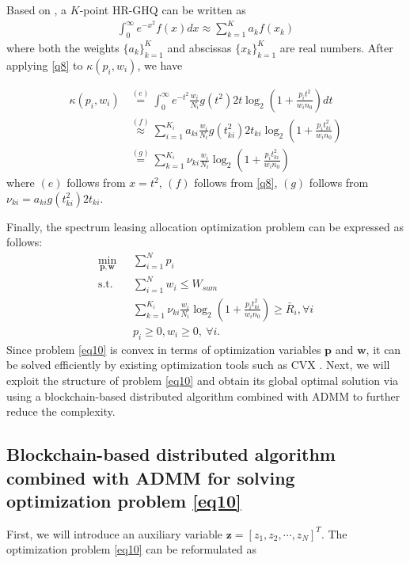 \documentclass[journal]{IEEEtran}
\begin{document}
Based on \cite{NMSteen}, a $K$-point HR-GHQ can be written as
\begin{align} \label{q8}
\int_{0}^{\infty}e^{-x^2} f\left(x\right) dx \approx \sum\limits_{k = 1}^{K} a_k f\left(x_k\right)
\end{align}
where both the weights $\{a_k\}_{k = 1}^K$ and abscissas $\{x_k\}_{k = 1}^K$ are real numbers. After applying \eqref{q8} to $\kappa \left(p_i, w_i\right)$, we have

\begin{align} \label{q9}
\kappa \left(p_i, w_i\right) &\overset{\left(e\right)}{=} \int_{0}^{\infty}e^{-t^2}\frac{w_i}{N_i} g\left(t^2\right) 2t \log_2\left(1 + \frac{p_it^2}{w_in_0}\right)dt  \nonumber \\
& \overset{\left(f\right)}{\approx} \sum\limits_{i = 1}^{K_i}a_{ki}\frac{w_i}{N_i}g\left(t_{ki}^2\right)2t_{ki}\log_2\left(1 + \frac{p_it_{ki}^2}{w_in_0}\right) \nonumber \\
& \overset{\left(g\right)}{=} \sum\limits_{k = 1}^{K_i}\nu_{ki}\frac{w_i}{N_i}\log_2\left(1 + \frac{p_it_{ki}^2}{w_in_0}\right)
\end{align}
where $\left(e\right)$ follows from $x = t^2$, $\left(f\right)$ follows from \eqref{q8}, $\left(g\right)$ follows from $\nu_{ki} = a_{ki}g\left(t_{ki}^2\right)2t_{ki}$.

Finally, the spectrum leasing allocation optimization problem can be expressed as follows:
\begin{subequations}\label{eq10}
	\begin{align}
	\min_{\mathbf{p}, \mathbf{w}}\ & \sum\limits_{i = 1}^{N} p_i \label{q10a} \\ \mbox{s.t.} \quad &  \sum\limits_{i = 1}^{N} w_i \leq W_{sum} \label{q10b} \\ \quad &  \sum\limits_{k = 1}^{K_i}\nu_{ki}\frac{w_i}{N_i}\log_2\left(1 + \frac{p_it_{ki}^2}{w_in_0}\right) \geq \bar{R}_i, \forall i \label{q10c}\\
	& p_i \geq 0, w_i \geq 0, \ \forall i. \label{q10d}
	\end{align}
\end{subequations}
Since problem \eqref{eq10} is convex in terms of optimization variables $\mathbf{p}$ and $\mathbf{w}$, it can be solved efficiently by existing optimization tools such as CVX \cite{SBoyd1}. Next, we will exploit the structure of problem \eqref{eq10} and obtain its global optimal solution via using a blockchain-based distributed algorithm combined with ADMM \cite{SBoyd2,EChen} to further reduce the complexity.
\subsection{Blockchain-based distributed algorithm combined with ADMM for solving optimization problem \eqref{eq10}}
First, we will introduce an auxiliary variable $\mathbf{z} = \left[z_1, z_2, \cdots, z_N\right]^T$. The optimization problem \eqref{eq10} can be reformulated as
\end{document}
